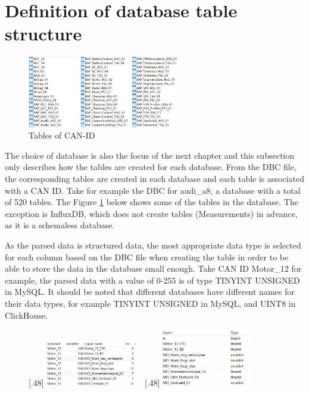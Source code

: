 \section{Definition of database table structure}

\begin{figure}[hbt!]
	\centering
 	\includegraphics[width=0.6\textwidth]{gfx/tables.png}  	  	 	
	\caption{Tables of CAN-ID}
	\label{fig:tables_can}
\end{figure}

The choice of database is also the focus of the next chapter and this subsection only describes how the tables are created for each database. From the DBC file, the corresponding tables are created in each database and each table is associated with a CAN ID. Take for example the DBC for audi\_a8, a database with a total of 520 tables. The Figure \ref{fig:tables_can} below shows some of the tables in the database. The exception is InfluxDB, which does not create tables (Measurements) in advance, as it is a schemaless database. 

As the parsed data is structured data, the most appropriate data type is selected for each column based on the DBC file when creating the table in order to be able to store the data in the database small enough. Take CAN ID Motor\_12 for example, the parsed data with a value of 0-255 is of type TINYINT UNSIGNED in MySQL. It should be noted that different databases have different names for their data types, for example TINYINT UNSIGNED in MySQL, and UINT8 in ClickHouse. 

\begin{figure}[htb]
	\centering	
 		[.48\linewidth]{
  		\includegraphics[width=0.35\textwidth]{gfx/motor_12_mysql.png} 	
  	}  	
  	~
 		[.48\linewidth]{
  		\includegraphics[width=0.35\textwidth]{gfx/datatype_mysql.png}  	
  	}	  
  		
	\caption{}
	\label{fig:ex_2_3}
\end{figure}


